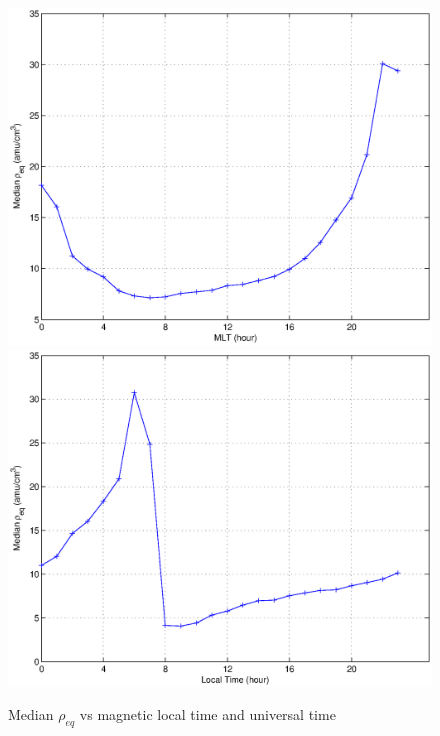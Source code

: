 \documentclass[10pt,twocolumn]{article}
\begin{document}
\begin{figure}[htp!]
\includegraphics[scale=0.45]{paperfigures/rhoMLT.eps}
\includegraphics[scale=0.45]{paperfigures/rhoLT.eps}
\caption{Median $\rho_{eq}$ vs magnetic local time and universal time}
\end{figure}
\end{document}
